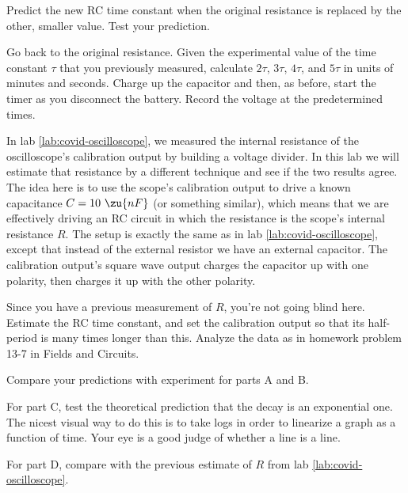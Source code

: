 Predict the new RC time constant when the original resistance is
replaced by the other, smaller value. Test your prediction.


Go back to the original resistance. Given the experimental value of
the time constant $\tau$ that you previously measured, calculate
$2\tau$, $3\tau$, $4\tau$, and $5\tau$ in units of minutes and seconds.
Charge up the capacitor and then, as before, start the timer as you
disconnect the battery. Record the voltage at the predetermined times.


In lab \ref{lab:covid-oscilloscope}, we measured the internal resistance of
the oscilloscope's calibration output by building a voltage divider. In this
lab we will estimate that resistance by a different technique and see if the
two results agree. The idea here is to use the scope's calibration output to
drive a known capacitance $C=10\ \zu{nF}$ (or something similar), which means that
we are effectively driving an RC circuit in which the resistance is the scope's
internal resistance $R$. The setup is exactly the same as in lab \ref{lab:covid-oscilloscope},
except that instead of the external resistor we have an external capacitor.
The calibration output's square wave output charges
the capacitor up with one polarity, then charges it up with the other polarity.

Since you have a previous measurement of $R$, you're not going blind here.
Estimate the RC time constant, and set the calibration output so that its half-period
is many times longer than this. Analyze the data as in homework problem 13-7
in Fields and Circuits.



\analysis

Compare your predictions with experiment for parts A and B.

For part C, test the theoretical prediction that the decay is
an exponential one. The nicest visual way to do this is to take
logs in order to linearize a graph as a function of time. Your
eye is a good judge of whether a line is a line.

For part D, compare with the previous estimate of $R$ from lab \ref{lab:covid-oscilloscope}.
